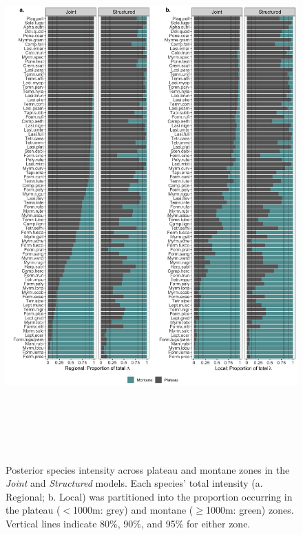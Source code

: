 \documentclass[preprint,review,times,12pt]{elsarticle}
\begin{document}
\begin{figure}
	\centering\includegraphics[height=8in]{ms/1_Ecography/1/figs/lambda_zones.png}
	\caption{\label{fig:lam_zones} Posterior species intensity across plateau and montane zones in the \emph{Joint} and \emph{Structured} models. Each species' total intensity (a. Regional; b. Local) was partitioned into the proportion occurring in the plateau ($<$1000m: grey) and montane ($\geq$1000m: green) zones. Vertical lines indicate 80\%, 90\%, and 95\% for either zone. }
\end{figure}
\end{document}
